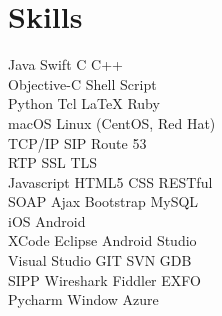 \documentclass[a4paper]{lyu-resume} %
\begin{document}
\begin{minipage}[t]{0.33\textwidth} %


\section{Skills}

Java \textbullet{} Swift \textbullet{} C \textbullet{} C++\\
Objective-C \textbullet{} Shell Script \\
Python \textbullet{} Tcl \textbullet{} \LaTeX \textbullet{} Ruby\\
macOS \textbullet{} Linux (CentOS, Red Hat)\\
TCP/IP \textbullet{} SIP \textbullet{} Route 53 \\
\textbullet{} RTP \textbullet{} SSL \textbullet{} TLS \\
Javascript \textbullet{} HTML5 \textbullet{} CSS \textbullet{} RESTful \\
SOAP \textbullet{} Ajax \textbullet{} Bootstrap \textbullet{} MySQL \\ 
iOS \textbullet{} Android \\
XCode \textbullet{} Eclipse \textbullet{} Android Studio\\
Visual Studio \textbullet{} GIT \textbullet{} SVN \textbullet{} GDB \\
SIPP \textbullet{} Wireshark \textbullet{} Fiddler \textbullet{} EXFO \\
Pycharm \textbullet{} Window Azure \\
\sectionspace %





\end{minipage}
\end{document}
